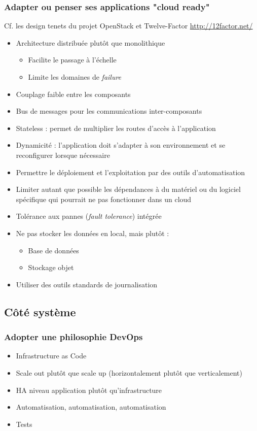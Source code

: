   \begin{frame}[allowframebreaks]
    \frametitle{Adapter ou penser ses applications "cloud ready"}
    Cf. les design tenets du projet OpenStack et Twelve-Factor \url{http://12factor.net/}
    \begin{itemize}
      \item Architecture distribuée plutôt que monolithique
      \begin{itemize}
        \item Facilite le passage à l'échelle
        \item Limite les domaines de \textit{failure}
      \end{itemize}\pause
      \item Couplage faible entre les composants
      \item Bus de messages pour les communications inter-composants\framebreak
      \item Stateless : permet de multiplier les routes d'accès à l'application\pause
      \item Dynamicité : l'application doit s'adapter à son environnement et se reconfigurer lorsque nécessaire\pause
      \item Permettre le déploiement et l'exploitation par des outils d'automatisation\pause
      \item Limiter autant que possible les dépendances à du matériel ou du logiciel spécifique qui pourrait ne pas fonctionner dans un cloud\pause
      \item Tolérance aux pannes (\textit{fault tolerance}) intégrée\pause
      \item Ne pas stocker les données en local, mais plutôt :
      \begin{itemize}
        \item Base de données
        \item Stockage objet
      \end{itemize}\pause
      \item Utiliser des outils standards de journalisation
    \end{itemize}
  \end{frame}

  \subsection{Côté système}

  \begin{frame}
    \frametitle{Adopter une philosophie DevOps}
    \begin{itemize}
      \item Infrastructure as Code
      \item Scale out plutôt que scale up (horizontalement plutôt que verticalement)
      \item HA niveau application plutôt qu'infrastructure
      \item Automatisation, automatisation, automatisation
      \item Tests
    \end{itemize}
  \end{frame}

